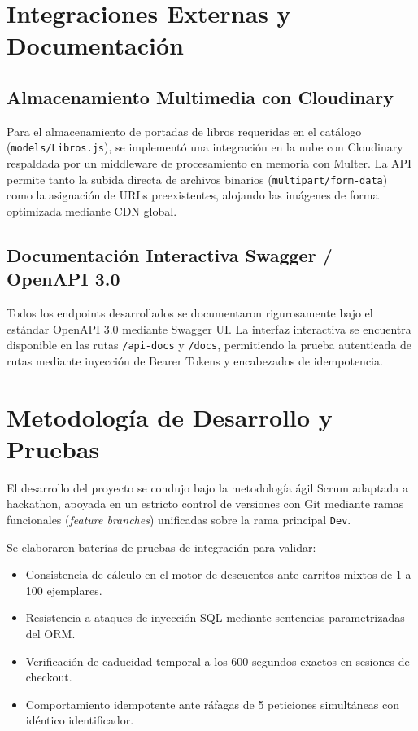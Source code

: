 \documentclass[conference]{IEEEtran}
\begin{document}
\section{Integraciones Externas y Documentación}

\subsection{Almacenamiento Multimedia con Cloudinary}
Para el almacenamiento de portadas de libros requeridas en el catálogo (\texttt{models/Libros.js}), se implementó una integración en la nube con Cloudinary respaldada por un middleware de procesamiento en memoria con Multer. La API permite tanto la subida directa de archivos binarios (\texttt{multipart/form-data}) como la asignación de URLs preexistentes, alojando las imágenes de forma optimizada mediante CDN global.

\subsection{Documentación Interactiva Swagger / OpenAPI 3.0}
Todos los endpoints desarrollados se documentaron rigurosamente bajo el estándar OpenAPI 3.0 mediante Swagger UI. La interfaz interactiva se encuentra disponible en las rutas \texttt{/api-docs} y \texttt{/docs}, permitiendo la prueba autenticada de rutas mediante inyección de Bearer Tokens y encabezados de idempotencia.

\section{Metodología de Desarrollo y Pruebas}
El desarrollo del proyecto se condujo bajo la metodología ágil Scrum adaptada a hackathon, apoyada en un estricto control de versiones con Git mediante ramas funcionales (\textit{feature branches}) unificadas sobre la rama principal \texttt{Dev}.

Se elaboraron baterías de pruebas de integración para validar:
\begin{itemize}
    \item Consistencia de cálculo en el motor de descuentos ante carritos mixtos de 1 a 100 ejemplares.
    \item Resistencia a ataques de inyección SQL mediante sentencias parametrizadas del ORM.
    \item Verificación de caducidad temporal a los 600 segundos exactos en sesiones de checkout.
    \item Comportamiento idempotente ante ráfagas de 5 peticiones simultáneas con idéntico identificador.
\end{itemize}
\end{document}
